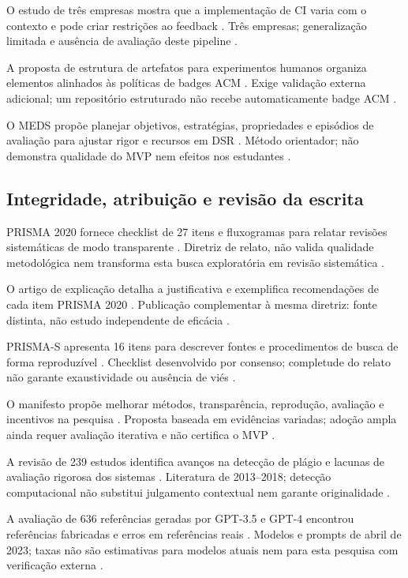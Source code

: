 O estudo de três empresas mostra que a implementação de CI varia com o contexto e pode criar restrições ao feedback \citep{eng16}. Três empresas; generalização limitada e ausência de avaliação deste pipeline \citep{eng16}.

A proposta de estrutura de artefatos para experimentos humanos organiza elementos alinhados às políticas de badges ACM \citep{eng18}. Exige validação externa adicional; um repositório estruturado não recebe automaticamente badge ACM \citep{eng18}.

O MEDS propõe planejar objetivos, estratégias, propriedades e episódios de avaliação para ajustar rigor e recursos em DSR \citep{eng20}. Método orientador; não demonstra qualidade do MVP nem efeitos nos estudantes \citep{eng20}.

\subsection{Integridade, atribuição e revisão da escrita}

PRISMA 2020 fornece checklist de 27 itens e fluxogramas para relatar revisões sistemáticas de modo transparente \citep{SU01}. Diretriz de relato, não valida qualidade metodológica nem transforma esta busca exploratória em revisão sistemática \citep{SU01}.

O artigo de explicação detalha a justificativa e exemplifica recomendações de cada item PRISMA 2020 \citep{SU02}. Publicação complementar à mesma diretriz: fonte distinta, não estudo independente de eficácia \citep{SU02}.

PRISMA-S apresenta 16 itens para descrever fontes e procedimentos de busca de forma reproduzível \citep{SU03}. Checklist desenvolvido por consenso; completude do relato não garante exaustividade ou ausência de viés \citep{SU03}.

O manifesto propõe melhorar métodos, transparência, reprodução, avaliação e incentivos na pesquisa \citep{SU04}. Proposta baseada em evidências variadas; adoção ampla ainda requer avaliação iterativa e não certifica o MVP \citep{SU04}.

A revisão de 239 estudos identifica avanços na detecção de plágio e lacunas de avaliação rigorosa dos sistemas \citep{SU05}. Literatura de 2013–2018; detecção computacional não substitui julgamento contextual nem garante originalidade \citep{SU05}.

A avaliação de 636 referências geradas por GPT-3.5 e GPT-4 encontrou referências fabricadas e erros em referências reais \citep{SU06}. Modelos e prompts de abril de 2023; taxas não são estimativas para modelos atuais nem para esta pesquisa com verificação externa \citep{SU06}.

